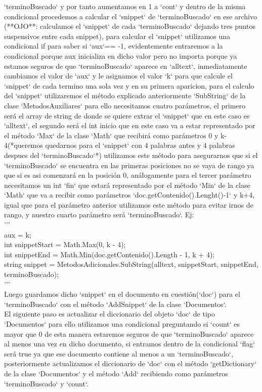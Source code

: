 \documentclass{article}
\begin{document}
`terminoBuscado` y por tanto aumentamos en 1 a `cont` y dentro de la misma condicional 
procedemos a calcular el `snippet` de `terminoBuscado` en ese archivo (**OJO**: calculamos 
el `snippet` de cada `terminoBuscado` dejando tres puntos suspensivos entre cada snippet),
para calcular el `snippet` utilizamos una condicional if para saber si `aux`== -1, 
evidentemente entraremos a la condicional porque aux inicializa en dicho valor pero no 
importa porque ya estamos seguros de que `terminoBuscado` aparece en `alltext`, inmediatamente
cambiamos el valor de `aux` y le asignamos el valor `k` para que calcule el `snippet` de cada
termino una sola vez y en su primera aparicion, para el calculo del `snippet` utilizaremos el 
método explicado anteriormente `SubString` de la clase `MetodosAuxiliares` para ello necesitamos
cuatro parámetros, el primero será el array de string de donde se quiere extrar el `snippet`
que en este caso es `alltext`, el segundo será el int inicio que en este caso va a estar 
representado por el método `Max` de la clase `Math` que recibirá como parámetros 0
y k-4(*queremos quedarnos para el `snippet` con 4 palabras antes y 4 palabras despues del
`terminoBuscado`*) utilizamos este método para asegurarnos que si el `terminoBuscado` se
encuentra en las primeras posiciones no se vaya de rango ya que si es asi comenzará en 
la posición 0, análogamente para el tercer parámetro necesitamos un int `fin` que estará 
representado por el método `Min` de la clase `Math` que va a recibir como parámetros 
`doc.getContenido().Lenght()-1` y k+4, igual que para el parámetro anterior utilizamos
este método para evitar irnos de rango, y nuestro cuarto parámetro será `terminoBuscado`. Ej:\\
'''\\
aux = k;\\
int snippetStart = Math.Max(0, k - 4);\\
int snippetEnd = Math.Min(doc.getContenido().Length - 1, k + 4);\\
string snippet = MetodosAdicionales.SubString(alltext, snippetStart, snippetEnd, terminoBuscado);\\
'''\\
Luego guardamos dicho `snippet` en el documento en cuestión(`doc`) para el `terminoBuscado`
con el método `AddSnippet` de la clase `Documentos`.\\

El siguiente paso es actualizar el diccionario del objeto `doc` de tipo `Documentos`
para ello utilizamos una condicional preguntando si `count` es mayor que 0 de esta
manera estaremos seguros de que `terminoBuscado` aparece al menos una vez en dicho 
documento, si entramos dentro de la condicional `flag` será true ya que ese documento
contiene al menos a un `terminoBuscado`, posteriormente actualizamos el diccionario de
`doc` con el método `getDictionary` de la clase `Documentos` y el método `Add` recibiendo
como parámetros `terminoBuscado` y `count`.\\
\end{document}

